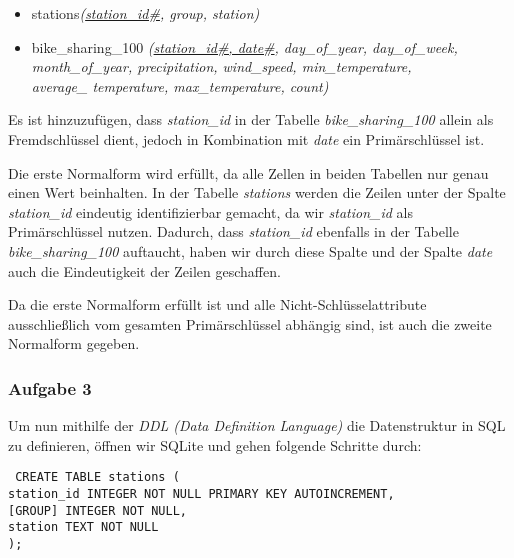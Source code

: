 \documentclass[a4paper, 12pt]{article}
\begin{document}
\vspace{\baselineskip}

\begin{itemize}
    \item stations\textit{(\underline{station\_id\#}, group, station)}
    \item bike\_sharing\_100\textit{
    (\underline{station\_id\#, date\#}, day\_of\_year, day\_of\_week,\\ month\_of\_year, precipitation, wind\_speed, min\_temperature,\\ average\_
    temperature, max\_temperature, count)
}
\end{itemize}

\vspace{\baselineskip}

Es ist hinzuzufügen, dass \textit{station\_id} in der Tabelle \textit{bike\_sharing\_100} allein als Fremdschlüssel dient, jedoch in Kombination mit \textit{date} ein Primärschlüssel ist. 

Die erste Normalform wird erfüllt, da alle Zellen in beiden Tabellen nur genau einen Wert beinhalten. In der Tabelle \textit{stations} werden die Zeilen unter der Spalte \textit{station\_id} eindeutig identifizierbar gemacht, da wir \textit{station\_id} als Primärschlüssel
nutzen. Dadurch, dass \textit{station\_id} ebenfalls in der Tabelle \textit{bike\_sharing\_100} auftaucht, haben wir durch diese Spalte und der Spalte \textit{date} auch die Eindeutigkeit der Zeilen geschaffen.

Da die erste Normalform erfüllt ist und alle Nicht-Schlüsselattribute ausschließlich vom gesamten Primärschlüssel abhängig sind, ist auch die zweite Normalform gegeben.

\newpage
\subsubsection{Aufgabe 3}

Um nun mithilfe der \textit{DDL (Data Definition Language)} die Datenstruktur in SQL zu definieren, öffnen wir SQLite und gehen folgende Schritte durch:

\vspace{\baselineskip} 

{\fontsize{10}{12}\selectfont
\texttt{%
CREATE TABLE stations ( \\
    station\_id INTEGER NOT NULL PRIMARY KEY AUTOINCREMENT, \\
    {[}GROUP{]} INTEGER NOT NULL, \\
    station TEXT NOT NULL \\
);
}}
\end{document}
